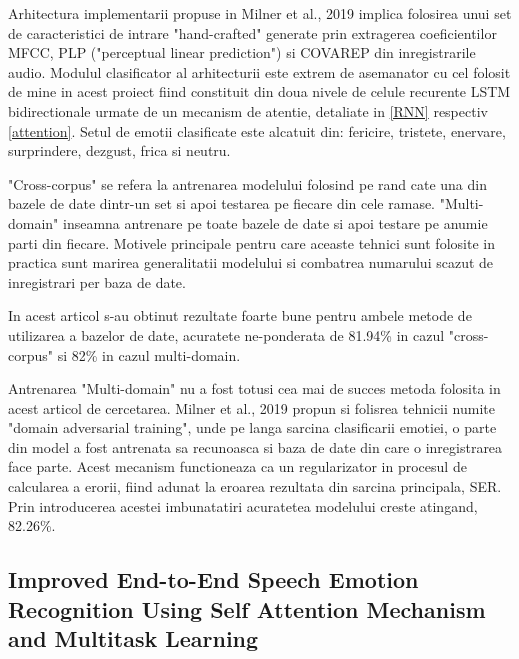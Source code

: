 \documentclass[a4paper,12pt]{book}
\begin{document}
					Arhitectura implementarii propuse in Milner et al., 2019 \cite{multi-domain} implica folosirea unui set de caracteristici de intrare "hand-crafted" generate prin extragerea coeficientilor MFCC, PLP ("perceptual linear prediction") si COVAREP \cite{covarep} din inregistrarile audio. Modulul clasificator al arhitecturii este extrem de asemanator cu cel folosit de mine in acest proiect fiind constituit din doua nivele de celule recurente LSTM bidirectionale  urmate de un mecanism de atentie, detaliate in \ref{RNN} respectiv \ref{attention}. Setul de emotii clasificate este alcatuit din: fericire, tristete, enervare, surprindere, dezgust, frica si neutru. \par
					
					"Cross-corpus" se refera la antrenarea modelului folosind pe rand cate una din bazele de date dintr-un set si apoi testarea pe fiecare din cele ramase. "Multi-domain" inseamna antrenare pe toate bazele de date si apoi testare pe anumie parti din fiecare. Motivele principale pentru care aceaste tehnici sunt folosite in practica sunt marirea generalitatii modelului si combatrea numarului scazut de inregistrari per baza de date. \par
					
					In acest articol s-au obtinut rezultate foarte bune pentru ambele metode de utilizarea a bazelor de date, acuratete ne-ponderata de  81.94\% in cazul "cross-corpus" si 82\% in cazul multi-domain. \par					
					
					Antrenarea "Multi-domain" nu a fost totusi cea mai de succes metoda folosita in acest articol de cercetarea. Milner et al., 2019 \cite{multi-domain} propun si folisrea tehnicii numite "domain adversarial training", unde pe langa sarcina clasificarii emotiei, o parte din model a fost antrenata sa recunoasca si baza de date din care o inregistrarea face parte. Acest mecanism functioneaza ca un regularizator in procesul de calcularea a erorii, fiind adunat la eroarea rezultata din sarcina principala, SER. Prin introducerea acestei imbunatatiri acuratetea modelului creste atingand, 82.26\%. \par
						
					\subsection{Improved End-to-End Speech Emotion Recognition Using Self Attention	Mechanism and Multitask Learning} \label{end-to-end2}
					
\end{document}
